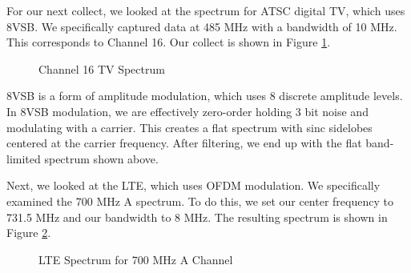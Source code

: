 \documentclass{article}
\begin{document}
For our next collect, we looked at the spectrum for ATSC digital TV, which uses 8VSB. We specifically captured data at 485 MHz with a bandwidth of 10 MHz. This corresponds to Channel 16. Our collect is shown in Figure \ref{fig::8vsb_spectrum}.

\begin{figure}[H]
	\centerline{}
	\caption{Channel 16 TV Spectrum}
	\label{fig::8vsb_spectrum}
\end{figure}


8VSB is a form of amplitude modulation, which uses 8 discrete amplitude levels. In 8VSB modulation, we are effectively zero-order holding 3 bit noise and modulating with a carrier. This creates a flat spectrum with sinc sidelobes centered at the carrier frequency. After filtering, we end up with the flat band-limited spectrum shown above.
 
Next, we looked at the LTE, which uses OFDM modulation. We specifically examined the 700 MHz A spectrum. To do this, we set our center frequency to 731.5 MHz and our bandwidth to 8 MHz. The resulting spectrum is shown in Figure \ref{fig::lte_spectrum}.

\begin{figure}[H]
	\centerline{}
	\caption{LTE Spectrum for 700 MHz A Channel}
	\label{fig::lte_spectrum}
\end{figure}
\end{document}
